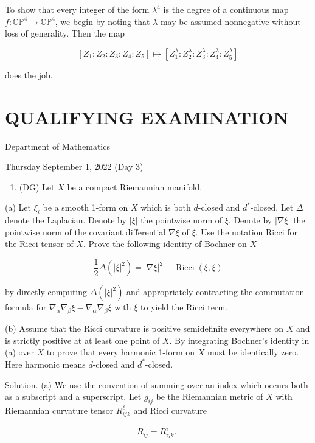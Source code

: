 \documentclass[10pt]{article}
\begin{document}
To show that every integer of the form $\lambda^{4}$ is the degree of a continuous map $f: \mathbb{C P}^{4} \rightarrow \mathbb{C P}^{4}$, we begin by noting that $\lambda$ may be assumed nonnegative without loss of generality. Then the map

$$
\left[Z_{1}: Z_{2}: Z_{3}: Z_{4}: Z_{5}\right] \mapsto\left[Z_{1}^{\lambda}: Z_{2}^{\lambda}: Z_{3}^{\lambda}: Z_{4}^{\lambda}: Z_{5}^{\lambda}\right]
$$

does the job.

\section*{QUALIFYING EXAMINATION }
Department of Mathematics

Thursday September 1, 2022 (Day 3)

\begin{enumerate}
  \item (DG) Let $X$ be a compact Riemannian manifold.
\end{enumerate}

(a) Let $\xi_{i}$ be a smooth 1-form on $X$ which is both $d$-closed and $d^{*}$-closed. Let $\Delta$ denote the Laplacian. Denote by $|\xi|$ the pointwise norm of $\xi$. Denote by $|\nabla \xi|$ the pointwise norm of the covariant differential $\nabla \xi$ of $\xi$. Use the notation Ricci for the Ricci tensor of $X$. Prove the following identity of Bochner on $X$

$$
\frac{1}{2} \Delta\left(|\xi|^{2}\right)=|\nabla \xi|^{2}+\operatorname{Ricci}(\xi, \xi)
$$

by directly computing $\Delta\left(|\xi|^{2}\right)$ and appropriately contracting the commutation formula for $\nabla_{\alpha} \nabla_{\beta} \xi-\nabla_{\alpha} \nabla_{\beta} \xi$ with $\xi$ to yield the Ricci term.

(b) Assume that the Ricci curvature is positive semidefinite everywhere on $X$ and is strictly positive at at least one point of $X$. By integrating Bochner's identity in (a) over $X$ to prove that every harmonic 1-form on $X$ must be identically zero. Here harmonic means $d$-closed and $d^{*}$-closed.

Solution. (a) We use the convention of summing over an index which occurs both as a subscript and a superscript. Let $g_{i j}$ be the Riemannian metric of $X$ with Riemannian curvature tensor $R_{i j k}^{\ell}$ and Ricci curvature

$$
R_{i j}=R_{i j k}^{i} \text {. }
$$
\end{document}
